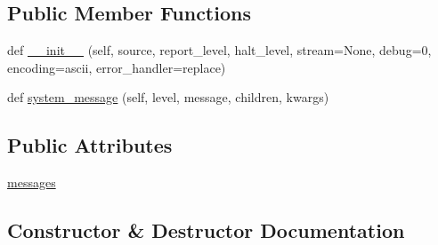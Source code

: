 \subsection*{Public Member Functions}
\begin{DoxyCompactItemize}
\item 
def \hyperlink{classsetuptools_1_1__distutils_1_1command_1_1check_1_1SilentReporter_aa93a83ef152f4d5af3e66ad9d795f5ec}{\+\_\+\+\_\+init\+\_\+\+\_\+} (self, source, report\+\_\+level, halt\+\_\+level, stream=None, debug=0, encoding=\textquotesingle{}ascii\textquotesingle{}, error\+\_\+handler=\textquotesingle{}replace\textquotesingle{})
\item 
def \hyperlink{classsetuptools_1_1__distutils_1_1command_1_1check_1_1SilentReporter_a18aabb1f210ce866a065385ce1cdf2cd}{system\+\_\+message} (self, level, message, children, kwargs)
\end{DoxyCompactItemize}
\subsection*{Public Attributes}
\begin{DoxyCompactItemize}
\item 
\hyperlink{classsetuptools_1_1__distutils_1_1command_1_1check_1_1SilentReporter_a50bccc97ad2b70408127701a7269ada1}{messages}
\end{DoxyCompactItemize}


\subsection{Constructor \& Destructor Documentation}
\mbox{\label{classsetuptools_1_1__distutils_1_1command_1_1check_1_1SilentReporter_aa93a83ef152f4d5af3e66ad9d795f5ec}} 
